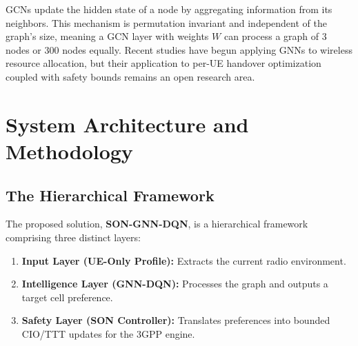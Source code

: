 \documentclass[12pt,a4paper,oneside]{report}
\begin{document}
GCNs update the hidden state of a node by aggregating information from its neighbors. This mechanism is permutation invariant and independent of the graph's size, meaning a GCN layer with weights $W$ can process a graph of 3 nodes or 300 nodes equally. Recent studies have begun applying GNNs to wireless resource allocation, but their application to per-UE handover optimization coupled with safety bounds remains an open research area.

\chapter{System Architecture and Methodology}
\label{ch:arch}

\section{The Hierarchical Framework}
The proposed solution, \textbf{SON-GNN-DQN}, is a hierarchical framework comprising three distinct layers:
\begin{enumerate}
    \item \textbf{Input Layer (UE-Only Profile):} Extracts the current radio environment.
    \item \textbf{Intelligence Layer (GNN-DQN):} Processes the graph and outputs a target cell preference.
    \item \textbf{Safety Layer (SON Controller):} Translates preferences into bounded CIO/TTT updates for the 3GPP engine.
\end{enumerate}
\end{document}
